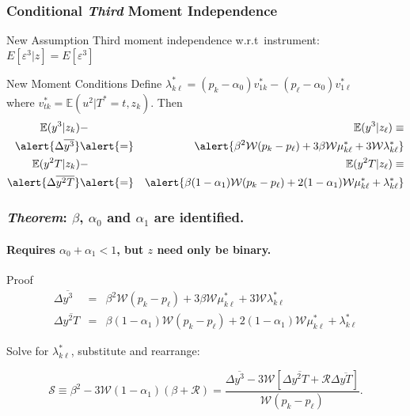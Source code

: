 \documentclass{beamer}
\begin{document}
\begin{frame}
  \frametitle{Conditional \emph{Third} Moment Independence}
  \begin{block}{New Assumption}
    Third moment independence w.r.t\ instrument: $E[\varepsilon^3|z]=E[\varepsilon^3]$
  \end{block}
  \begin{alertblock}{New Moment Conditions}
    Define $\lambda_{k\ell}^* = (p_k - \alpha_0) v_{1k}^* - (p_\ell - \alpha_0) v_{1\ell}^*$\\ where 
  $v^*_{tk} =  \mathbb{E}(u^2|T^*=t, z_k)$. Then
  \begin{eqnarray*}
    \mathbb{E}(y^3|z_k) &-& \mathbb{E}(y^3|z_\ell)  \equiv \\ \alert{\Delta\overline{y^3}} &\alert{=}& \alert{\beta^2 \mathcal{W} (p_k - p_\ell)  + 3 \beta \mathcal{W} \mu_{k\ell}^* + 3 \mathcal{W} \lambda^*_{k\ell}}\\
    \mathbb{E}(y^2T|z_k) &-& \mathbb{E}(y^2T|z_\ell) \equiv \\ \alert{\Delta\overline{y^2T}} &\alert{=}&  \alert{\beta(1-\alpha_1)\mathcal{W}(p_k - p_\ell) + 2(1-\alpha_1)\mathcal{W}\mu_{k\ell}^* + \lambda_{k\ell}^*}
  \end{eqnarray*}
  \end{alertblock}
\end{frame}
\begin{frame}
  \frametitle{\emph{Theorem}: $\beta$, $\alpha_0$ and $\alpha_1$ are identified.}
  \framesubtitle{Requires $\alpha_0 + \alpha_1 < 1$, but $z$ need only be binary.}
  \begin{block}{Proof}
    \vspace{-1em}
  \begin{eqnarray*}
    \Delta\overline{y^3} &=& \beta^2 \mathcal{W} (p_k - p_\ell)  + 3 \beta \mathcal{W} \mu_{k\ell}^* + 3 \mathcal{W} \lambda^*_{k\ell}\\
    \Delta\overline{y^2T} &=& \beta(1-\alpha_1)\mathcal{W}(p_k - p_\ell) + 2(1-\alpha_1)\mathcal{W}\mu_{k\ell}^* + \lambda_{k\ell}^* 
  \end{eqnarray*}

  \vspace{1em}

    Solve for $\lambda^*_{k\ell}$, substitute and rearrange: 

  \begin{equation*}
    \mathcal{S} \equiv \beta^2 - 3\mathcal{W}(1-\alpha_1) (\beta + \mathcal{R}) = \frac{\Delta\overline{y^3} - 3 \mathcal{W}\left[ \Delta\overline{y^2T}+\mathcal{R}\Delta\overline{yT} \right]}{\mathcal{W}(p_k - p_\ell)}.
  \end{equation*}
  \end{block}
\end{frame}
\end{document}
